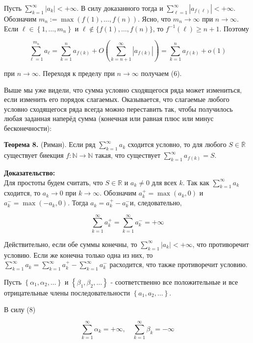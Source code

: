 \documentclass[a4paper,12pt]{article} %
\begin{document}
	Пусть $\sum_{k=1}^{\infty}\left|a_{k}\right|<+\infty$. В силу доказанного тогда и $\sum_{\ell=1}^{\infty}\left|a_{f(\ell)}\right|<+\infty$. Обозначим $m_{n}:=\max (f(1), \ldots, f(n))$. Ясно, что $m_{n} \rightarrow \infty$ при $n \rightarrow \infty$. Если $\ell \in\left\{1, \ldots, m_{n}\right\}$ и $\ell \notin\{f(1), \ldots, f(n)\}$, то $f^{-1}(\ell) \geq n+1$. Поэтому
	
	$$
	\sum_{\ell=1}^{m_{n}} a_{\ell}=\sum_{k=1}^{n} a_{f(k)}+O\left(\sum_{k=n+1}^{\infty}\left|a_{f(k)}\right|\right)=\sum_{k=1}^{n} a_{f(k)}+o(1)
	$$
	
	при $n \rightarrow \infty$. Переходя к пределу при $n \rightarrow \infty$ получаем (6).
	
	Выше мы уже видели, что сумма условно сходящегося ряда может измениться, если изменить его порядок слагаемых. Оказывается, что слагаемые любого условно сходящегося ряда всегда можно переставить так, чтобы получилось любая заданная наперёд сумма (конечная или равная плюс или минус бесконечности):
	
	\textbf{Теорема 8.} (Риман). Если ряд $\sum_{k=1}^{\infty} a_{k}$ сходится условно, то для любого $S \in \overline{\mathbb{R}}$ существует биекция $f: \mathbb{N} \rightarrow \mathbb{N}$ такая, что существует $\sum_{k=1}^{\infty} a_{f(k)}=S$.
	
	\textbf{Доказательство:\\}
	Для простоты будем считать, что $S \in \mathbb{R}$ и $a_{k} \neq 0$ для всех $k$. Так как $\sum_{k=1}^{\infty} a_{k}$ сходится, то $a_{k} \rightarrow 0$ при $k \rightarrow \infty$. Обозначим $a_{k}^{+}=\max \left(a_{k}, 0\right)$ и $a_{k}^{-}=\max \left(-a_{k}, 0\right)$. Тогда $a_{k}=a_{k}^{+}-a_{k}^{-}$и, следовательно,
	
	$$
	\sum_{k=1}^{\infty} a_{k}^{+}=\sum_{k=1}^{\infty} a_{k}^{-}=+\infty
	$$
	
	Действительно, если обе суммы конечны, то $\sum_{k=1}^{\infty}\left|a_{k}\right|<+\infty$, что противоречит условию. Если же конечна только одна из них, то $\sum_{k=1}^{\infty} a_{k}=\sum_{k=1}^{\infty} a_{k}^{+}-\sum_{k=1}^{\infty} a_{k}^{-}$ расходится, что также противоречит условию.
	
	Пусть $\left\{\alpha_{1}, \alpha_{2}, \ldots\right\}$ и $\left\{\beta_{1}, \beta_{2}, \ldots\right\}$ - соответственно все положительные и все отрицательные члены последовательности $\left\{a_{1}, a_{2}, \ldots\right\}$.
	
	В силу (8)
	
	$$
	\sum_{k=1}^{\infty} \alpha_{k}=+\infty, \quad \sum_{k=1}^{\infty} \beta_{k}=-\infty
	$$
	
\end{document}
